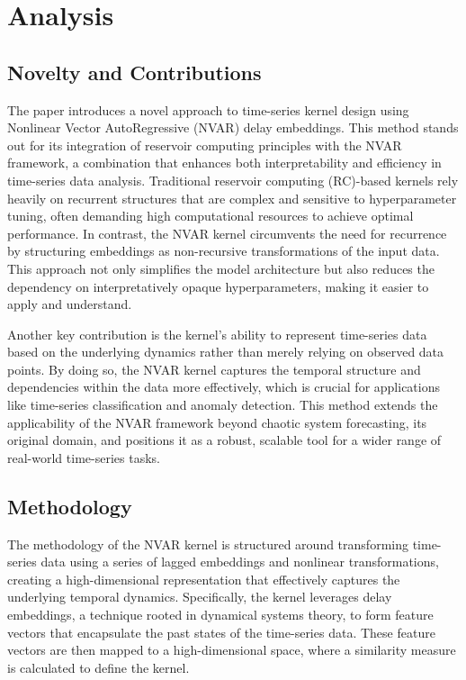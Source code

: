 \chapter{Analysis} \label{chap:analysis}

\section{Novelty and Contributions}

The paper introduces a novel approach to time-series kernel design using Nonlinear Vector AutoRegressive (NVAR) delay embeddings. This method stands out for its integration of reservoir computing principles with the NVAR framework, a combination that enhances both interpretability and efficiency in time-series data analysis. Traditional reservoir computing (RC)-based kernels rely heavily on recurrent structures that are complex and sensitive to hyperparameter tuning, often demanding high computational resources to achieve optimal performance. In contrast, the NVAR kernel circumvents the need for recurrence by structuring embeddings as non-recursive transformations of the input data. This approach not only simplifies the model architecture but also reduces the dependency on interpretatively opaque hyperparameters, making it easier to apply and understand.

Another key contribution is the kernel's ability to represent time-series data based on the underlying dynamics rather than merely relying on observed data points. By doing so, the NVAR kernel captures the temporal structure and dependencies within the data more effectively, which is crucial for applications like time-series classification and anomaly detection. This method extends the applicability of the NVAR framework beyond chaotic system forecasting, its original domain, and positions it as a robust, scalable tool for a wider range of real-world time-series tasks.

\section{Methodology}

The methodology of the NVAR kernel is structured around transforming time-series data using a series of lagged embeddings and nonlinear transformations, creating a high-dimensional representation that effectively captures the underlying temporal dynamics. Specifically, the kernel leverages delay embeddings, a technique rooted in dynamical systems theory, to form feature vectors that encapsulate the past states of the time-series data. These feature vectors are then mapped to a high-dimensional space, where a similarity measure is calculated to define the kernel.

